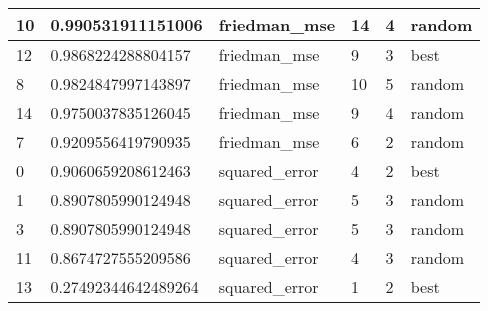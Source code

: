 \begin{table}[!ht]
\begin{tabular}{|l|l|l|l|l|l|}
        10 & 0.990531911151006 & friedman\_mse & 14 & 4 & random \\ \hline
        12 & 0.9868224288804157 & friedman\_mse & 9 & 3 & best \\ \hline
        8 & 0.9824847997143897 & friedman\_mse & 10 & 5 & random \\ \hline
        14 & 0.9750037835126045 & friedman\_mse & 9 & 4 & random \\ \hline
        7 & 0.9209556419790935 & friedman\_mse & 6 & 2 & random \\ \hline
        0 & 0.9060659208612463 & squared\_error & 4 & 2 & best \\ \hline
        1 & 0.8907805990124948 & squared\_error & 5 & 3 & random \\ \hline
        3 & 0.8907805990124948 & squared\_error & 5 & 3 & random \\ \hline
        11 & 0.8674727555209586 & squared\_error & 4 & 3 & random \\ \hline
        13 & 0.27492344642489264 & squared\_error & 1 & 2 & best \\ \hline
    \end{tabular}
\end{table}